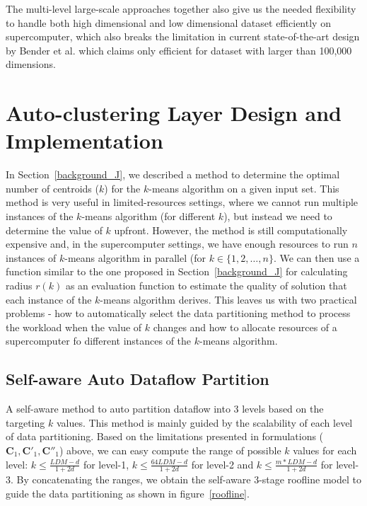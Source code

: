 \documentclass[10pt,journal,compsoc]{IEEEtran}
\begin{document}
The multi-level large-scale approaches together also give us the needed flexibility to handle both high dimensional and low dimensional dataset efficiently on supercomputer, which also breaks the limitation in current state-of-the-art design by Bender et al. \cite{bender2015k} which claims only efficient for dataset with larger than 100,000 dimensions. 

\section{Auto-clustering Layer Design and Implementation}\label{auto-implementation}

In Section~\ref{background_J}, we described a method to determine the optimal number of centroids ($k$) for the $k$-means algorithm on a given input set. This method is very useful in limited-resources settings, where we cannot run multiple instances of the $k$-means algorithm (for different $k$), but instead we need to determine the value of $k$ upfront. However, the method is still computationally expensive and, in the supercomputer settings, we have enough resources to run $n$ instances of $k$-means algorithm in parallel (for $k \in \{1,2,\dots,n\}$. We can then use a function similar to the one proposed in Section~\ref{background_J} for calculating radius $r(k)$ as an evaluation function to estimate the quality of solution that each instance of the $k$-means algorithm derives. This leaves us with two practical problems - how to automatically select the data partitioning method to process the workload when the value of $k$ changes and how to allocate resources of a supercomputer fo different instances of the $k$-means algorithm.
\subsection{Self-aware Auto Dataflow Partition} 
A self-aware method to auto partition dataflow into 3 levels based on the targeting $k$ values. This method is mainly guided by the scalability of each level of data partitioning. Based on the limitations presented in formulations ($\mathbf{C}_1,\mathbf{C'}_1,\mathbf{C''}_1$) above, we can easy compute the range of possible $k$ values for each level: $k \leq \frac{LDM-d}{1+2d}$ for level-1, $k \leq \frac{64LDM-d}{1+2d}$ for level-2 and $k \leq \frac{m*LDM-d}{1+2d}$ for level-3. By concatenating the ranges, we obtain the self-aware 3-stage roofline model to guide the data partitioning as shown in figure~\ref{roofline}.
\end{document}
